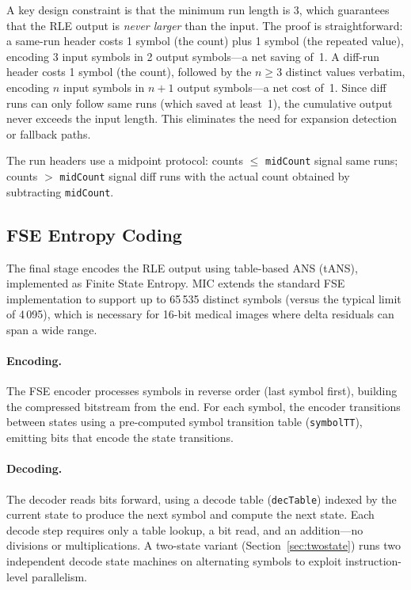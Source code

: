 \documentclass[11pt,twocolumn]{article}
\begin{document}
A key design constraint is that the minimum run length is 3, which guarantees that the RLE output is \emph{never larger} than the input.
The proof is straightforward: a same-run header costs 1 symbol (the count) plus 1 symbol (the repeated value), encoding 3 input symbols in 2 output symbols---a net saving of~1.
A diff-run header costs 1 symbol (the count), followed by the $n \geq 3$ distinct values verbatim, encoding $n$ input symbols in $n+1$ output symbols---a net cost of~1.
Since diff runs can only follow same runs (which saved at least~1), the cumulative output never exceeds the input length.
This eliminates the need for expansion detection or fallback paths.

The run headers use a midpoint protocol: counts $\leq$ \texttt{midCount} signal same runs; counts $>$ \texttt{midCount} signal diff runs with the actual count obtained by subtracting \texttt{midCount}.

\subsection{FSE Entropy Coding}
\label{sec:fse}

The final stage encodes the RLE output using table-based ANS (tANS), implemented as Finite State Entropy.
MIC extends the standard FSE implementation to support up to 65\,535 distinct symbols (versus the typical limit of 4\,095), which is necessary for 16-bit medical images where delta residuals can span a wide range.

\paragraph{Encoding.}
The FSE encoder processes symbols in reverse order (last symbol first), building the compressed bitstream from the end.
For each symbol, the encoder transitions between states using a pre-computed symbol transition table (\texttt{symbolTT}), emitting bits that encode the state transitions.

\paragraph{Decoding.}
The decoder reads bits forward, using a decode table (\texttt{decTable}) indexed by the current state to produce the next symbol and compute the next state.
Each decode step requires only a table lookup, a bit read, and an addition---no divisions or multiplications.
A two-state variant (Section~\ref{sec:twostate}) runs two independent decode state machines on alternating symbols to exploit instruction-level parallelism.
\end{document}
